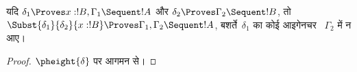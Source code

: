 \documentclass[../../../include/open-logic-section]{subfiles}
\begin{document}
\begin{prop}
यदि $\delta_1 \Proves x:!B, \Gamma_1 \Sequent !A$ और $\delta_2 \Proves
\Gamma_2 \Sequent !B$, तो $\Subst{\delta_1}{\delta_2}{x:!B} \Proves
\Gamma_1, \Gamma_2 \Sequent !A$, बशर्ते~$\delta_1$ का कोई आइगेनचर
~$\Gamma_2$ में न आए।
\end{prop}


\begin{proof}
  $\pheight{\delta}$ पर आगमन से।
\end{proof}
\end{document}
